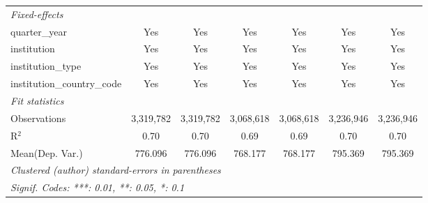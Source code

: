 \begin{tabular}{lcccccc}
   \midrule
   \emph{Fixed-effects}\\
   quarter\_year                      & Yes       & Yes       & Yes       & Yes       & Yes       & Yes\\  
   institution                        & Yes       & Yes       & Yes       & Yes       & Yes       & Yes\\  
   institution\_type                  & Yes       & Yes       & Yes       & Yes       & Yes       & Yes\\  
   institution\_country\_code         & Yes       & Yes       & Yes       & Yes       & Yes       & Yes\\  
   \midrule
   \emph{Fit statistics}\\
   Observations                       & 3,319,782 & 3,319,782 & 3,068,618 & 3,068,618 & 3,236,946 & 3,236,946\\  
   R$^2$                              & 0.70      & 0.70      & 0.69      & 0.69      & 0.70      & 0.70\\  
Mean(Dep. Var.) & 776.096 & 776.096 & 768.177 & 768.177 & 795.369 & 795.369 \\
   \midrule \midrule
   \multicolumn{7}{l}{\emph{Clustered (author) standard-errors in parentheses}}\\
   \multicolumn{7}{l}{\emph{Signif. Codes: ***: 0.01, **: 0.05, *: 0.1}}\\
\end{tabular}
\par\endgroup
